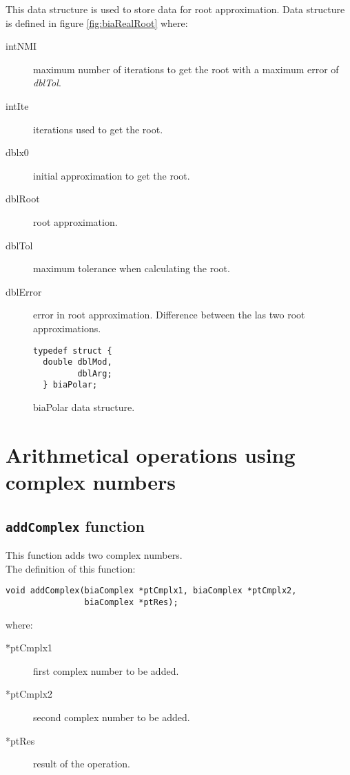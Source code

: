 This data structure is used to store data for root approximation. Data structure is defined in figure \ref{fig:biaRealRoot} where:

\begin{description}
\item[intNMI] maximum number of iterations to get the root with a maximum error of \emph{dblTol}.
\item[intIte] iterations used to get the root.
\item[dblx0] initial approximation to get the root.
\item[dblRoot] root approximation.
\item[dblTol] maximum tolerance when calculating the root.
\item[dblError] error in root approximation. Difference between the las two root approximations.
\end{description}

\begin{figure}[!h]
\begin{verbatim}
typedef struct {
  double dblMod,
         dblArg;
  } biaPolar;
\end{verbatim}
\caption{biaPolar data structure.} \label{fig:biaPolar}
\end{figure}

\FloatBarrier

\section{Arithmetical operations using complex numbers}

\subsection{\texttt{addComplex} function}

This function adds two complex numbers.\\

The definition of this function:
%
\begin{verbatim}
void addComplex(biaComplex *ptCmplx1, biaComplex *ptCmplx2, 
                biaComplex *ptRes);
\end{verbatim}
%
where:
%
\begin{description}
\item[*ptCmplx1] first complex number to be added.
\item[*ptCmplx2] second complex number to be added.
\item[*ptRes] result of the operation.
\end{description}

